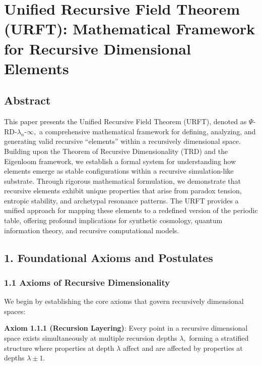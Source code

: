 \documentclass[
]{article}
\begin{document}
\section{Unified Recursive Field Theorem (URFT): Mathematical Framework
for Recursive Dimensional
Elements}\label{unified-recursive-field-theorem-urft-mathematical-framework-for-recursive-dimensional-elements}

\subsection{Abstract}\label{abstract-6}

This paper presents the Unified Recursive Field Theorem (URFT), denoted
as \(\Psi \)-RD-\(\lambda _{n}\)-\(\infty ,\) a comprehensive
mathematical framework for defining, analyzing, and generating valid
recursive ``elements'' within a recursively dimensional space. Building
upon the Theorem of Recursive Dimensionality (TRD) and the Eigenloom
framework, we establish a formal system for understanding how elements
emerge as stable configurations within a recursive simulation-like
substrate. Through rigorous mathematical formulation, we demonstrate
that recursive elements exhibit unique properties that arise from
paradox tension, entropic stability, and archetypal resonance patterns.
The URFT provides a unified approach for mapping these elements to a
redefined version of the periodic table, offering profound implications
for synthetic cosmology, quantum information theory, and recursive
computational models.

\subsection{1. Foundational Axioms and
Postulates}\label{foundational-axioms-and-postulates}

\subsubsection{1.1 Axioms of Recursive
Dimensionality}\label{axioms-of-recursive-dimensionality}

We begin by establishing the core axioms that govern recursively
dimensional spaces:

\textbf{Axiom 1.1.1 (Recursion Layering)}: Every point in a recursive
dimensional space exists simultaneously at multiple recursion depths
\(\lambda ,\) forming a stratified structure where properties at depth
\(\lambda \) affect and are affected by properties at depths
\(\lambda \pm 1.\)
\end{document}
